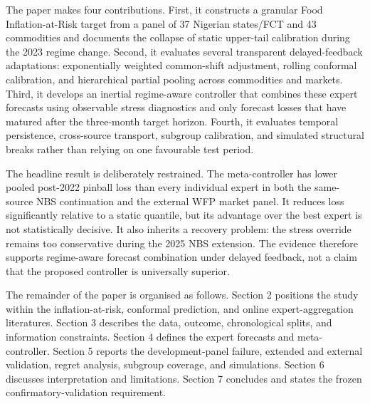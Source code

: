 The paper makes four contributions. First, it constructs a granular Food
Inflation-at-Risk target from a panel of 37 Nigerian states/FCT and 43
commodities and documents the collapse of static upper-tail calibration
during the 2023 regime change. Second, it evaluates several transparent
delayed-feedback adaptations: exponentially weighted common-shift
adjustment, rolling conformal calibration, and hierarchical partial
pooling across commodities and markets. Third, it develops an inertial
regime-aware controller that combines these expert forecasts using
observable stress diagnostics and only forecast losses that have matured
after the three-month target horizon. Fourth, it evaluates temporal
persistence, cross-source transport, subgroup calibration, and simulated
structural breaks rather than relying on one favourable test period.

The headline result is deliberately restrained. The meta-controller has
lower pooled post-2022 pinball loss than every individual expert in both
the same-source NBS continuation and the external WFP market panel. It
reduces loss significantly relative to a static quantile, but its
advantage over the best expert is not statistically decisive. It also
inherits a recovery problem: the stress override remains too
conservative during the 2025 NBS extension. The evidence therefore
supports regime-aware forecast combination under delayed feedback, not a
claim that the proposed controller is universally superior.

The remainder of the paper is organised as follows. Section 2 positions
the study within the inflation-at-risk, conformal prediction, and online
expert-aggregation literatures. Section 3 describes the data, outcome,
chronological splits, and information constraints. Section 4 defines the
expert forecasts and meta-controller. Section 5 reports the
development-panel failure, extended and external validation, regret
analysis, subgroup coverage, and simulations. Section 6 discusses
interpretation and limitations. Section 7 concludes and states the
frozen confirmatory-validation requirement.
